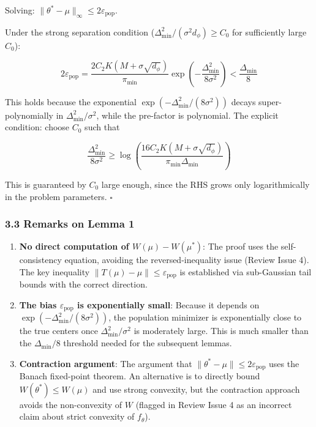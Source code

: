 \documentclass[
  12pt,
]{ctexart}
\begin{document}
Solving: \(\|\theta^* - \mu\|_\infty \leq 2\varepsilon_{\text{pop}}\).

Under the strong separation condition
(\(\Delta_{\min}^2 / (\sigma^2 d_\phi) \geq C_0\) for sufficiently large
\(C_0\)):

\[2\varepsilon_{\text{pop}} = \frac{2C_2 K(M + \sigma\sqrt{d_\phi})}{\pi_{\min}} \exp\left(-\frac{\Delta_{\min}^2}{8\sigma^2}\right) < \frac{\Delta_{\min}}{8}\]

This holds because the exponential
\(\exp(-\Delta_{\min}^2/(8\sigma^2))\) decays super-polynomially in
\(\Delta_{\min}^2/\sigma^2\), while the pre-factor is polynomial. The
explicit condition: choose \(C_0\) such that

\[\frac{\Delta_{\min}^2}{8\sigma^2} \geq \log\left( \frac{16C_2 K(M + \sigma\sqrt{d_\phi})}{\pi_{\min} \Delta_{\min}} \right)\]

This is guaranteed by \(C_0\) large enough, since the RHS grows only
logarithmically in the problem parameters. \(\square\)

\subsubsection{3.3 Remarks on Lemma 1}\label{remarks-on-lemma-1}

\begin{enumerate}
\def\labelenumi{\arabic{enumi}.}
\item
  \textbf{No direct computation of \(W(\mu) - W(\mu^*)\)}: The proof
  uses the self-consistency equation, avoiding the reversed-inequality
  issue (Review Issue 4). The key inequality
  \(\|T(\mu) - \mu\| \leq \varepsilon_{\text{pop}}\) is established via
  sub-Gaussian tail bounds with the correct direction.
\item
  \textbf{The bias \(\varepsilon_{\text{pop}}\) is exponentially small}:
  Because it depends on \(\exp(-\Delta_{\min}^2/(8\sigma^2))\), the
  population minimizer is exponentially close to the true centers once
  \(\Delta_{\min}^2/\sigma^2\) is moderately large. This is much smaller
  than the \(\Delta_{\min}/8\) threshold needed for the subsequent
  lemmas.
\item
  \textbf{Contraction argument}: The argument that
  \(\|\theta^* - \mu\| \leq 2\varepsilon_{\text{pop}}\) uses the Banach
  fixed-point theorem. An alternative is to directly bound
  \(W(\theta^*) \leq W(\mu)\) and use strong convexity, but the
  contraction approach avoids the non-convexity of \(W\) (flagged in
  Review Issue 4 as an incorrect claim about strict convexity of
  \(f_\theta\)).
\end{enumerate}
\end{document}
